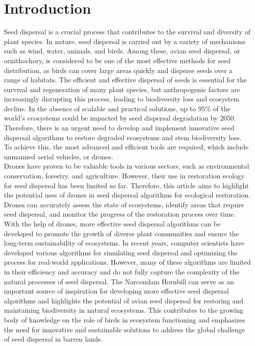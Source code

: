 \documentclass[conference]{IEEEtran}
\begin{document}
\section{Introduction}
Seed dispersal is a crucial process that contributes to the survival and diversity of plant species. In nature, seed dispersal is carried out by a variety of mechanisms such as wind, water, animals, and birds. Among these, avian seed dispersal, or ornithochory, is considered to be one of the most effective methods for seed distribution, as birds can cover large areas quickly and disperse seeds over a range of habitats. The efficient and effective dispersal of seeds is essential for the survival and regeneration of many plant species, but anthropogenic factors are increasingly disrupting this process, leading to biodiversity loss and ecosystem decline. In the absence of scalable and practical solutions, up to 95\% of the world's ecosystems could be impacted by seed dispersal degradation by 2050. Therefore, there is an urgent need to develop and implement innovative seed dispersal algorithms to restore degraded ecosystems\cite{1} and stem biodiversity loss. To achieve this, the most advanced and efficient tools are required, which include unmanned aerial vehicles, or drones. 
\\Drones have proven to be valuable tools in various sectors, such as environmental conservation, forestry, and agriculture\cite{2}. However, their use in restoration ecology for seed dispersal has been limited so far. Therefore, this article aims to highlight the potential uses of drones in seed dispersal algorithms for ecological restoration. Drones can accurately assess the state of ecosystems, identify areas that require seed dispersal, and monitor the progress of the restoration process over time\cite{3}. With the help of drones, more effective seed dispersal algorithms can be developed to promote the growth of diverse plant communities and ensure the long-term sustainability of ecosystems. In recent years, computer scientists have developed various algorithms for simulating seed dispersal and optimizing the process for real-world applications. However, many of these algorithms are limited in their efficiency and accuracy and do not fully capture the complexity of the natural processes of seed dispersal. The Narcondam Hornbill can serve as an important source of inspiration for developing more effective seed dispersal algorithms and highlights the potential of avian seed dispersal for restoring and maintaining biodiversity in natural ecosystems. This contributes to the growing body of knowledge on the role of birds in ecosystem functioning and emphasizes the need for innovative and sustainable solutions to address the global challenge of seed dispersal in barren lands.
\end{document}
